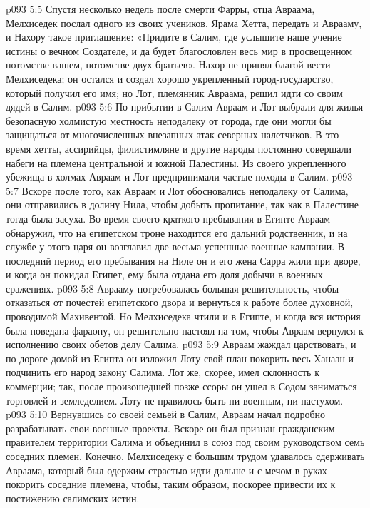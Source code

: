 \vs p093 5:5 Спустя несколько недель после смерти Фарры, отца Авраама, Мелхиседек послал одного из своих учеников, Ярама Хетта, передать и Аврааму, и Нахору такое приглашение: «Придите в Салим, где услышите наше учение истины о вечном Создателе, и да будет благословлен весь мир в просвещенном потомстве вашем, потомстве двух братьев». Нахор не принял благой вести Мелхиседека; он остался и создал хорошо укрепленный город\hyp{}государство, который получил его имя; но Лот, племянник Авраама, решил идти со своим дядей в Салим.
\vs p093 5:6 По прибытии в Салим Авраам и Лот выбрали для жилья безопасную холмистую местность неподалеку от города, где они могли бы защищаться от многочисленных внезапных атак северных налетчиков. В это время хетты, ассирийцы, филистимляне и другие народы постоянно совершали набеги на племена центральной и южной Палестины. Из своего укрепленного убежища в холмах Авраам и Лот предпринимали частые походы в Салим.
\vs p093 5:7 \pc Вскоре после того, как Авраам и Лот обосновались неподалеку от Салима, они отправились в долину Нила, чтобы добыть пропитание, так как в Палестине тогда была засуха. Во время своего краткого пребывания в Египте Авраам обнаружил, что на египетском троне находится его дальний родственник, и на службе у этого царя он возглавил две весьма успешные военные кампании. В последний период его пребывания на Ниле он и его жена Сарра жили при дворе, и когда он покидал Египет, ему была отдана его доля добычи в военных сражениях.
\vs p093 5:8 Аврааму потребовалась большая решительность, чтобы отказаться от почестей египетского двора и вернуться к работе более духовной, проводимой Махивентой. Но Мелхиседека чтили и в Египте, и когда вся история была поведана фараону, он решительно настоял на том, чтобы Авраам вернулся к исполнению своих обетов делу Салима.
\vs p093 5:9 \pc Авраам жаждал царствовать, и по дороге домой из Египта он изложил Лоту свой план покорить весь Ханаан и подчинить его народ закону Салима. Лот же, скорее, имел склонность к коммерции; так, после произошедшей позже ссоры он ушел в Содом заниматься торговлей и земледелием. Лоту не нравилось быть ни военным, ни пастухом.
\vs p093 5:10 Вернувшись со своей семьей в Салим, Авраам начал подробно разрабатывать свои военные проекты. Вскоре он был признан гражданским правителем территории Салима и объединил в союз под своим руководством семь соседних племен. Конечно, Мелхиседеку с большим трудом удавалось сдерживать Авраама, который был одержим страстью идти дальше и с мечом в руках покорить соседние племена, чтобы, таким образом, поскорее привести их к постижению салимских истин.
